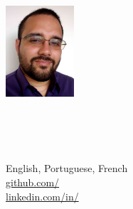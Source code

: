 


\begin{minipage}{1.1in}
  \centering \includegraphics[width=1in]{photo}
\end{minipage}
\begin{minipage}{\dimexpr(\textwidth-1.2in)}
  \begin{minipage}{.7\linewidth}
    \centering
    {\Huge \skills \name} \\
    {\color{highlight} \Large{\role}} \vspace{2em}
  \end{minipage}
  \begin{minipage}{.3\linewidth}
    \raggedleft
    \begin{small}
      \faPhone \enspace \phone \\
      \faEnvelope \enspace \href{mailto:\email}{\email} \\
      \faLanguage \enspace English, Portuguese, French \\
      \faGithub \enspace \href{https://github.com/\github}{github.com/\github} \\
      \faLinkedin \enspace \href{https://www.linkedin.com/in/\LinkedIn}{linkedin.com/in/\LinkedIn}
    \end{small}
  \end{minipage}
  \enskip
  {\color{highlight}\hrulefill}
  
\end{minipage}
